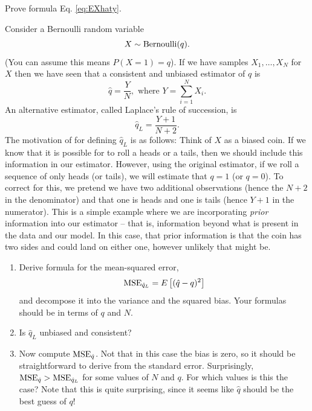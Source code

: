 \begin{exercise}
Prove formula Eq. \ref{eq:EXhaty}. 
\end{exercise}
\begin{exercise}
Consider a Bernoulli random variable 
\begin{equation*}
X \sim {\rm Bernoulli}(q).
\end{equation*}
(You can assume this means $P(X=1)=q$). 
If we have samples $X_1,\dots,X_N$ for $X$ then we have seen that a consistent and unbiased estimator of $q$ is 
\begin{equation*}
\hat{q} = \frac{Y}{N}, \text{ where }Y = \sum_{i=1}^NX_i.
\end{equation*}
An alternative estimator, called Laplace's rule of succession, is 
\begin{equation*}
\hat{q}_L = \frac{Y+1}{N+2}.
\end{equation*}
The motivation of for defining $\hat{q}_L$ is as follows: Think of $X$ as a biased coin. If we know that it is possible for to roll a heads or a tails, then we should include this information in our estimator. However, using the original estimator, if we roll a sequence of only heads (or tails), we will estimate that $q=1$ (or $q=0$). To correct for this, we pretend we have two additional observations (hence the $N+2$ in the denominator) and that one is heads and one is tails (hence $Y+1$ in the numerator). This is a simple example where we are incorporating \emph{prior} information  into our estimator -- that is, information beyond what is present in the data and our model. In this case, that prior information is that the coin has two sides and could land on either one, however unlikely that might be. 

\begin{enumerate}[label=(\alph*)]
\item Derive formula for the mean-squared error,
\begin{equation*}
{\rm MSE}_{\hat{q}_L} = E\left[(\hat{q}-q)^2 \right]
\end{equation*}
and decompose it into the variance and the squared bias. Your formulas should be in terms of $q$ and $N$.
\item Is $\hat{q}_L$ unbiased and consistent? 
\item Now compute ${\rm MSE}_{\hat{q}}$. Not that in this case the bias is zero, so it should be straightforward to derive from the standard error.  Surprisingly, ${\rm MSE}_{\hat{q}}>{\rm MSE}_{\hat{q}_L}$ for some values of $N$ and $q$. For which values is this the case? Note that this is quite surprising, since it seems like $\hat{q}$ should be the best guess of $q$!  \end{enumerate}


\end{exercise}


